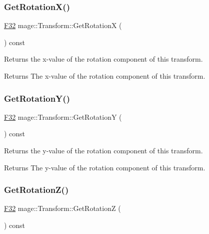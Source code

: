 \subsubsection{\texorpdfstring{Get\+Rotation\+X()}{GetRotationX()}}
{\footnotesize\ttfamily \hyperlink{namespacemage_aa97e833b45f06d60a0a9c4fc22ae02c0}{F32} mage\+::\+Transform\+::\+Get\+RotationX (\begin{DoxyParamCaption}{ }\end{DoxyParamCaption}) const\hspace{0.3cm}{\ttfamily [noexcept]}}

Returns the x-\/value of the rotation component of this transform.

\begin{DoxyReturn}{Returns}
The x-\/value of the rotation component of this transform. 
\end{DoxyReturn}
\hypertarget{classmage_1_1_transform_ac1962d03093b3671fcfb6a9b4f410628}{}\label{classmage_1_1_transform_ac1962d03093b3671fcfb6a9b4f410628} 
\subsubsection{\texorpdfstring{Get\+Rotation\+Y()}{GetRotationY()}}
{\footnotesize\ttfamily \hyperlink{namespacemage_aa97e833b45f06d60a0a9c4fc22ae02c0}{F32} mage\+::\+Transform\+::\+Get\+RotationY (\begin{DoxyParamCaption}{ }\end{DoxyParamCaption}) const\hspace{0.3cm}{\ttfamily [noexcept]}}

Returns the y-\/value of the rotation component of this transform.

\begin{DoxyReturn}{Returns}
The y-\/value of the rotation component of this transform. 
\end{DoxyReturn}
\hypertarget{classmage_1_1_transform_a1c2ae96eb6c0d33afd406ca1685b74f5}{}\label{classmage_1_1_transform_a1c2ae96eb6c0d33afd406ca1685b74f5} 
\subsubsection{\texorpdfstring{Get\+Rotation\+Z()}{GetRotationZ()}}
{\footnotesize\ttfamily \hyperlink{namespacemage_aa97e833b45f06d60a0a9c4fc22ae02c0}{F32} mage\+::\+Transform\+::\+Get\+RotationZ (\begin{DoxyParamCaption}{ }\end{DoxyParamCaption}) const\hspace{0.3cm}{\ttfamily [noexcept]}}

